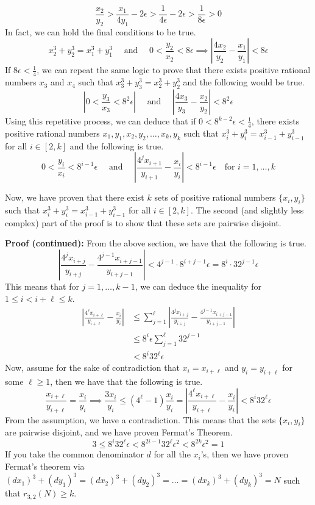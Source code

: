 \documentclass[8pt]{extarticle}
\begin{document}
\begin{boxedsection}
    $$
    \frac{x_2}{y_2} > \frac{x_1}{4y_1} - 2\epsilon > \frac{1}{4\epsilon} - 2\epsilon > \frac{1}{8\epsilon} > 0
    $$
    In fact, we can hold the final conditions to be true.
    $$
    x_2^3 + y_2^3 = x_1^3 + y_1^3 \quad \text{ and } \quad 0 < \frac{y_2}{x_2} < 8\epsilon \implies \left|\frac{4x_2}{y_2} - \frac{x_1}{y_1}\right| < 8\epsilon
    $$
    If $8\epsilon < \frac{1}{4}$, we can repeat the same logic to prove that there exists positive rational numbers $x_3$ and $x_4$ such that $x_3^3 + y_3^3 = x_2^3 + y_2^3$ and the following would be true.
    $$
    \left|0 < \frac{y_3}{x_3} < 8^2 \epsilon\right| \quad \text{ and } \quad \left|\frac{4x_3}{y_3} - \frac{x_2}{y_2}\right| < 8^2 \epsilon
    $$
    Using this repetitive process, we can deduce that if $0 < 8^{k-2}\epsilon < \frac{1}{4}$, there exists positive rational numbers $x_1, y_1, x_2, y_2, \dots, x_k , y_k$ such that $x_i^3 + y_i^3 = x_{i-1}^3 + y_{i-1}^3$ for all $i \in [2,k]$ and the following is true.
    $$
    0 < \frac{y_i}{x_i} < 8^{i-1}\epsilon \quad \text{ and } \quad \left|\frac{4^j x_{i+1}}{y_{i+1}} - \frac{x_i}{y_i}\right| < 8^{i-1}\epsilon \quad \text{for } i = 1,\dots,k
    $$
\end{boxedsection}
Now, we have proven that there exist $k$ sets of positive rational numbers $\{x_i, y_i\}$ such that $x_i^3 + y_i^3 = x_{i-1}^3 + y_{i-1}^3$ for all $i \in [2,k]$. The second (and slightly less complex) part of the proof is to show that these sets are pairwise disjoint. 
\begin{boxedsection}
\textbf{Proof (continued):} From the above section, we have that the following is true.
$$
\left| \frac{4^j x_{i+j}}{y_{i+j}} - \frac{4^{j-1}x_{i+j-1}}{y_{i+j-1}} \right| < 4^{j-1} \cdot 8^{i+j-1} \epsilon = 8^i \cdot 32^{j-1}\epsilon
$$
This means that for $j = 1, \dots, k-1$, we can deduce the inequality for $1 \leq i < i + \ell \leq k$.
\begin{align*}
\left| \frac{4^\ell x_{i+\ell}}{y_{i+\ell}}  - \frac{x_i}{y_i}\right| &\leq \sum_{j=1}^\ell \left| \frac{4^j x_{i+j}}{y_{i+j}} - \frac{4^{j-1}x_{i+j-1}}{y_{i+j-1}} \right|\\
&\leq 8^i\epsilon \sum_{j=1}^\ell 32^{j-1}\\
&< 8^i 32^\ell \epsilon
\end{align*}
Now, assume for the sake of contradiction that $x_i = x_{i+\ell}$ and $y_i = y_{i+\ell}$ for some $\ell \geq 1$, then we have that the following is true.
$$
\frac{x_{i+\ell}}{y_{i+\ell}} = \frac{x_i}{y_i} \implies \frac{3x_i}{y_i} \leq (4^\ell - 1)\frac{x_i}{y_i} = \left| \frac{4^\ell x_{i+\ell}}{y_{i+\ell}}  - \frac{x_i}{y_i}\right| < 8^i32^\ell \epsilon
$$
From the assumption, we have a contradiction. This means that the sets $\{x_i, y_i\}$ are pairwise disjoint, and we have proven Fermat's Theorem.
$$
3 \leq 8^i32^\ell \epsilon < 8^{2i-1}32^\ell \epsilon^2 < 8^{2k}\epsilon^2 = 1
$$
If you take the common denominator $d$ for all the $x_i$'s, then we have proven Fermat's theorem via $(dx_1)^3 + (dy_1)^3 = (dx_2)^3 + (dy_2)^3 = \dots = (dx_k)^3 + (dy_k)^3 = N$ such that $r_{3,2}(N) \geq k$.
\end{boxedsection}
\end{document}
